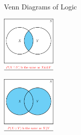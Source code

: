 \begin{frame}{Venn Diagrams of Logic}

\begin{center}\includegraphics[width=100px]{figures/venn_diagram_xandy} \end{center}

\begin{center}\includegraphics[width=100px]{figures/venn_diagram_xory} \end{center}

\end{frame}

